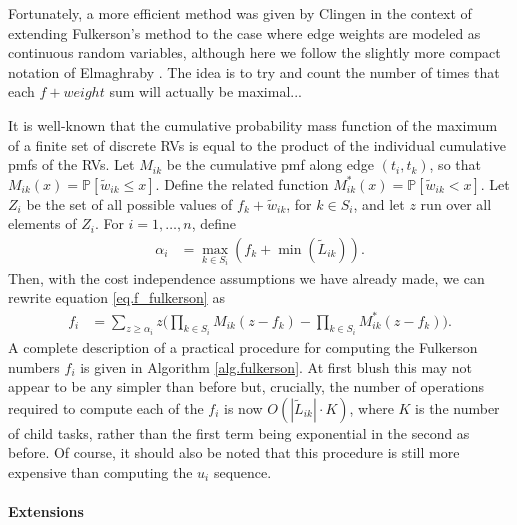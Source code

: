 \documentclass[12pt]{article}
\def\P{\mathbb{P}}
\begin{document}
Fortunately, a more efficient method was given by Clingen \cite{cling64} in the context of extending Fulkerson's method to the case where edge weights are modeled as continuous random variables, although here we follow the slightly more compact notation of Elmaghraby \cite{elmaghraby67}. The idea is to try and count the number of times that each $f + weight$ sum will actually be maximal... 

It is well-known that the cumulative probability mass function of the maximum of a finite set of discrete RVs is equal to the product of the individual cumulative pmfs of the RVs. Let $M_{ik}$ be the cumulative pmf along edge $(t_i, t_k)$, so that $M_{ik}(x) = \P[\tilde{w}_{ik} \leq x]$. Define the related function $M_{ik}^{*}(x) = \P[\tilde{w}_{ik} < x]$. Let $Z_i$ be the set of all possible values of $f_k + \tilde{w}_{ik}$, for $k \in S_i$, and let $z$ run over all elements of $Z_i$. For $i = 1, \dots, n$, define 
\begin{align}
\alpha_i &= \max_{k \in S_i}(f_k + \min(\tilde{L}_{ik})).
\end{align}
Then, with the cost independence assumptions we have already made, we can rewrite equation \eqref{eq.f_fulkerson} as 
\begin{align}
f_i &= \sum_{z \geq \alpha_i} z \bigg( \prod_{k \in S_i} M_{ik}(z - f_k) - \prod_{k \in S_i} M_{ik}^{*}(z - f_k) \bigg). \label{eq.f_clingen}
\end{align}
A complete description of a practical procedure for computing the Fulkerson numbers $f_i$ is given in Algorithm \ref{alg.fulkerson}. At first blush this may not appear to be any simpler than before but, crucially, the number of  operations required to compute each of the $f_i$ is now $O(|\tilde{L}_{ik}| \cdot K)$, where $K$ is the number of child tasks, rather than the first term being exponential in the second as before. Of course, it should also be noted that this procedure is still more expensive than computing the $u_i$ sequence. 

 

\paragraph{Extensions}
\label{para.fulkerson_extensions}
\end{document}
